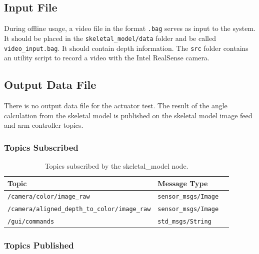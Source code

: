 \documentclass{CSSRforAfrica}
\begin{document}
\subsection*{Input File}
During offline usage, a video file in the format \texttt{.bag} serves as input to the system. It should be placed in the \texttt{skeletal\_model/data} folder and be called \texttt{video\_input.bag}. It should contain depth information. The \texttt{src} folder contains an utility script to record a video with the Intel RealSense camera. 

\subsection*{Output Data File}
There is no output data file for the actuator test. The result of the angle calculation from the skeletal model is published on the skeletal model image feed and arm controller topics. 


\subsubsection*{Topics Subscribed}
\begin{longtable}[c]{|l|l|l|}
    \caption{Topics subscribed by the skeletal\_model node.} \label{tab:Published_topics} \\
    \hline
    \rowcolor{gray!30}
    \footnotesize{\textbf{Topic}} & \footnotesize{\textbf{Message Type}} \\ \hline
    \endhead %
    
    \footnotesize{\texttt{/camera/color/image\_raw}} & \footnotesize{\texttt{sensor\_msgs/Image}} \\ \hline
    \footnotesize{\texttt{/camera/aligned\_depth\_to\_color/image\_raw}} & \footnotesize{\texttt{sensor\_msgs/Image}} \\ \hline
    \footnotesize{\texttt{/gui/commands}} & \footnotesize{\texttt{std\_msgs/String}} \\ \hline

\end{longtable}
\newpage 
\subsubsection*{Topics Published}
\end{document}
